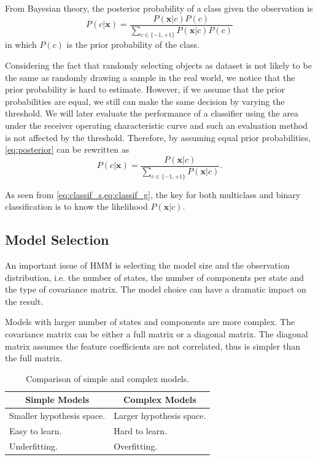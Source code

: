\documentclass[letterpaper, 10 pt, conference]{ieeeconf}
\begin{document}
From Bayesian theory, the posterior probability of a class given the observation is
\begin{equation} \label{eq:posterior}
  P(c|\mathbf{x}) = \frac{P(\mathbf{x}|c)P(c)}{\sum_{c \in \{-1,+1\}} P(\mathbf{x}|c)P(c)}
\end{equation}
in which $P(c)$ is the prior probability of the class.

Considering the fact that randomly selecting objects as dataset is not likely to be the same as randomly drawing a sample in the real world, we notice that the prior probability is hard to estimate. However, if we assume that the prior probabilities are equal, we still can make the same decision by varying the threshold. We will later evaluate the performance of a classifier using the area under the receiver operating characteristic curve and such an evaluation method is not affected by the threshold. Therefore, by assuming equal prior probabilities, \cref{eq:posterior} can be rewritten as
\begin{equation}
  \label{eq:postsimp}
  P(c|\mathbf{x}) = \frac{P(\mathbf{x}|c)}{\sum_{c \in \{-1,+1\}} P(\mathbf{x}|c)} .
\end{equation}

As seen from \cref{eq:classif_s,eq:classif_g}, the key for both multiclass and binary classification is to know the likelihood $P(\mathbf{x}|c)$.

\subsection{Model Selection}
An important issue of HMM is selecting the model size and the observation distribution, i.e. the number of states, the number of components per state and the type of covariance matrix. The model choice can have a dramatic impact on the result.

Models with larger number of states and components are more complex. The covariance matrix can be either a full matrix or a diagonal matrix. The diagonal matrix assumes the feature coefficients are not correlated, thus is simpler than the full matrix.

\begin{table}[t]
  \caption{Comparison of simple and complex models.}
  \label{tab:model}
  \centering
  \begin{tabular}{p{.42\linewidth}p{.42\linewidth}}
    \toprule
    \multicolumn{1}{c}{\bfseries Simple Models} & \multicolumn{1}{c}{\bfseries Complex Models} \\ \midrule
    Smaller hypothesis space. & Larger hypothesis space. \\
    Easy to learn. & Hard to learn. \\
    Underfitting. & Overfitting. \\
    \bottomrule
  \end{tabular}
\end{table}
\end{document}
